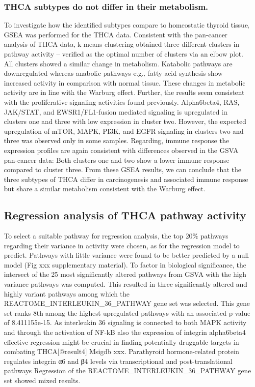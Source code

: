 \documentclass[
]{article}
\begin{document}
\hypertarget{thca-subtypes-do-not-differ-in-their-metabolism.}{%
\subsubsection{THCA subtypes do not differ in their
metabolism.}\label{thca-subtypes-do-not-differ-in-their-metabolism.}}

To investigate how the identified subtypes compare to homeostatic
thyroid tissue, GSEA was performed for the THCA data. Consistent with
the pan-cancer analysis of THCA data, k-means clustering obtained three
different clusters in pathway activity -- verified as the optimal number
of clusters via an elbow plot. All clusters showed a similar change in
metabolism. Katabolic pathways are downregulated whereas anabolic
pathways e.g., fatty acid synthesis show increased activity in
comparison with normal tissue. These changes in metabolic activity are
in line with the Warburg effect. Further, the results seem consistent
with the proliferative signaling activities found previously.
Alpha6beta4, RAS, JAK/STAT, and EWSR1/FL1-fusion mediated signaling is
upregulated in clusters one and three with low expression in cluster
two. However, the expected upregulation of mTOR, MAPK, PI3K, and EGFR
signaling in clusters two and three was observed only in some samples.
Regarding, immune response the expression profiles are again consistent
with differences observed in the GSVA pan-cancer data: Both clusters one
and two show a lower immune response compared to cluster three. From
these GSEA results, we can conclude that the three subtypes of THCA
differ in carcinogenesis and associated immune response but share a
similar metabolism consistent with the Warburg effect.

\hypertarget{regression-analysis-of-thca-pathway-activity}{%
\subsection{Regression analysis of THCA pathway
activity}\label{regression-analysis-of-thca-pathway-activity}}

To select a suitable pathway for regression analysis, the top 20\%
pathways regarding their variance in activity were chosen, as for the
regression model to predict. Pathways with little variance were found to
be better predicted by a null model (Fig xxx supplementary material). To
factor in biological significance, the intersect of the 25 most
significantly altered pathways from GSVA with the high variance pathways
was computed. This resulted in three significantly altered and highly
variant pathways among which the REACTOME\_INTERLEUKIN\_36\_PATHWAY gene
set was selected. This gene set ranks 8th among the highest upregulated
pathways with an associated p-value of 8.411155e-15. As interleukin 36
signaling is connected to both MAPK activity and through the activation
of NF-kB also the expression of integrin alpha6beta4 effective
regression might be crucial in finding potentially druggable targets in
combating THCA{[}@result4{]} Msigdb xxx. Parathyroid hormone-related
protein regulates integrin α6 and β4 levels via transcriptional and
post-translational pathways Regression of the
REACTOME\_INTERLEUKIN\_36\_PATHWAY gene set showed mixed results.
\end{document}
